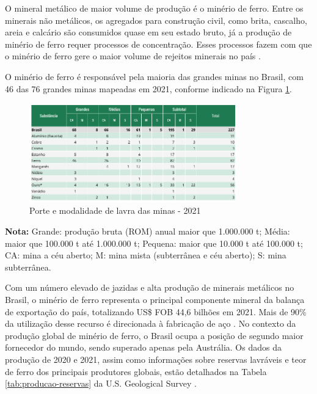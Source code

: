O mineral metálico de maior volume de produção é o minério de ferro. Entre os minerais não metálicos, os agregados para construção civil, como brita, cascalho, areia e calcário são consumidos quase em seu estado bruto, já a produção de minério de ferro requer processos de concentração. Esses processos fazem com que o minério de ferro gere o maior volume de rejeitos minerais no país \cite{carvalho2018sustentabilidade}.

O minério de ferro é responsável pela maioria das grandes minas no Brasil, com 46 das 76 grandes minas mapeadas em 2021, conforme indicado na Figura \ref{fig:porte_lavra}.

\begin{figure}[!htb]
    \centering
    \includegraphics[width=0.8\textwidth]{figures/image13_porte_lavra.png}
    \caption{Porte e modalidade de lavra das minas - 2021}
    \label{fig:porte_lavra}
\end{figure}

\textbf{Nota:} Grande: produção bruta (ROM) anual maior que 1.000.000 t; Média: maior que 100.000 t até 1.000.000 t; Pequena: maior que 10.000 t até 100.000 t; CA: mina a céu aberto; M: mina mista (subterrânea e céu aberto); S: mina subterrânea.

Com um número elevado de jazidas e alta produção de minerais metálicos no Brasil, o minério de ferro representa o principal componente mineral da balança de exportação do país, totalizando US\$ FOB 44,6 bilhões em 2021. Mais de 90\% da utilização desse recurso é direcionada à fabricação
de aço \cite{carvalho2014minerio}. No contexto da produção global de minério de ferro, o Brasil ocupa a posição de segundo maior fornecedor do mundo, sendo superado apenas pela Austrália. Os dados da produção de 2020 e 2021, assim como informações sobre reservas lavráveis e teor de ferro dos principais produtores globais, estão detalhados na Tabela \ref{tab:producao-reservas} da U.S. Geological Survey \cite{usgs2022iron}.

